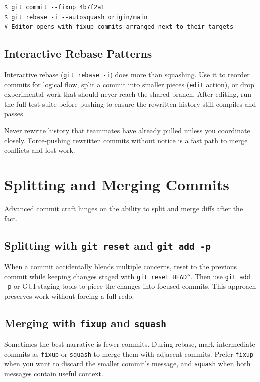 \begin{lstlisting}[style=shell,caption={Autosquash keeps history clean without manual editing}]
$ git commit --fixup 4b7f2a1
$ git rebase -i --autosquash origin/main
# Editor opens with fixup commits arranged next to their targets
\end{lstlisting}

\subsection{Interactive Rebase Patterns}
Interactive rebase (\texttt{git rebase -i}) does more than squashing. Use it to reorder commits for logical flow, split a commit into smaller pieces (\texttt{edit} action), or drop experimental work that should never reach the shared branch. After editing, run the full test suite before pushing to ensure the rewritten history still compiles and passes.

\begin{warningbox}
Never rewrite history that teammates have already pulled unless you coordinate closely. Force-pushing rewritten commits without notice is a fast path to merge conflicts and lost work.
\end{warningbox}

\section{Splitting and Merging Commits}
Advanced commit craft hinges on the ability to split and merge diffs after the fact.

\subsection{Splitting with \texttt{git reset} and \texttt{git add -p}}
When a commit accidentally blends multiple concerns, reset to the previous commit while keeping changes staged with \texttt{git reset HEAD\textasciicircum}. Then use \texttt{git add -p} or GUI staging tools to piece the changes into focused commits. This approach preserves work without forcing a full redo.

\subsection{Merging with \texttt{fixup} and \texttt{squash}}
Sometimes the best narrative is fewer commits. During rebase, mark intermediate commits as \texttt{fixup} or \texttt{squash} to merge them with adjacent commits. Prefer \texttt{fixup} when you want to discard the smaller commit's message, and \texttt{squash} when both messages contain useful context.

